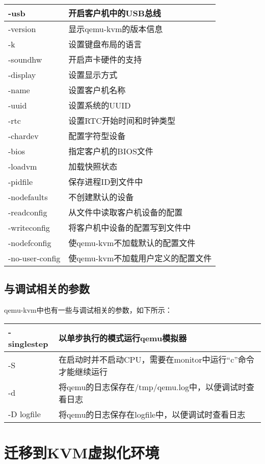 \documentclass[a4paper,left=2.5cm,right=2.5cm,11pt]{article}
\newcommand{\interval}{\vspace{0.5em}}
\begin{document}
\begin{longtable}{p{3cm}p{10cm}}
	\hline
	-usb & 开启客户机中的USB总线 \\
	\hline
	-version & 显示qemu-kvm的版本信息 \\
	\hline
	-k & 设置键盘布局的语言 \\
	\hline
	-soundhw & 开启声卡硬件的支持 \\
	\hline
	-display & 设置显示方式 \\
	\hline
	-name & 设置客户机名称 \\
	\hline
	-uuid & 设置系统的UUID \\
	\hline
	-rtc & 设置RTC开始时间和时钟类型 \\
	\hline
	-chardev & 配置字符型设备 \\
	\hline
	-bios & 指定客户机的BIOS文件 \\
	\hline
	-loadvm & 加载快照状态 \\
	\hline
	-pidfile & 保存进程ID到文件中 \\
	\hline
	-nodefaults & 不创建默认的设备 \\
	\hline
	-readconfig & 从文件中读取客户机设备的配置 \\
	\hline
	-writeconfig & 将客户机中设备的配置写到文件中 \\
	\hline
	-nodefconfig & 使qemu-kvm不加载默认的配置文件 \\
	\hline
	-no-user-config & 使qemu-kvm不加载用户定义的配置文件 \\
	\hline
	\end{longtable}

\subsection{与调试相关的参数}
	qemu-kvm中也有一些与调试相关的参数，如下所示：
	\interval
	\begin{longtable}{p{3cm}p{10cm}}
	\hline
	-singlestep & 以单步执行的模式运行qemu模拟器 \\
	\hline
	-S & 在启动时并不启动CPU，需要在monitor中运行“c”命令才能继续运行 \\
	\hline
	-d & 将qemu的日志保存在/tmp/qemu.log中，以便调试时查看日志 \\
	\hline
	-D logfile & 将qemu的日志保存在logfile中，以便调试时查看日志 \\
	\hline
	\end{longtable}

\clearpage

\section{迁移到KVM虚拟化环境} 
\end{document}
